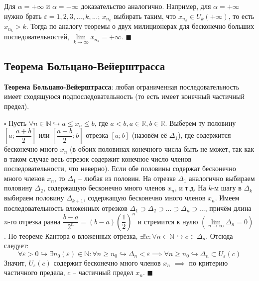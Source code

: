 \documentclass[12pt, a4paper, reqno]{article}
\begin{document}
    Для $\alpha = +\infty$ и $\alpha = -\infty$ доказательство аналогично. Например, для
    $\alpha = +\infty$ нужно брать $\varepsilon = 1, 2, 3, ..., k, ...$; $x_{n_k}$ выбирать таким,
    что $x_{n_k}\in U_{k}(+\infty)$, то есть $x_{n_k} > k$. Тогда по аналогу теоремы о двух
    милиционерах для бесконечно больших последовательностей, $\lim\limits_{k\to\infty} x_{n_k} =
    +\infty$. $\blacksquare$

\subsection{Теорема Больцано-Вейерштрасса}

    \textbf{Теорема Больцано-Вейерштрасса}: любая ограниченная последовательность имеет сходящуюся
    подпоследовательность (то есть имеет конечный частичный предел).

    $\square$ Пусть $\forall n\in\mathbb{N} \hookrightarrow a \leq x_n \leq b$, где $a < b,
    a\in\mathbb{R}, b\in\mathbb{R}$. Выберем ту половину $\left[a; \dfrac{a + b}{2}\right]$ или
    $\left[\dfrac{a + b}{2}; b\right]$ отрезка $[a; b]$ (назовём её $\Delta_1$), где содержится
    бесконечно много $x_n$ (в обоих половинах конечного числа быть не может, так как в таком случае
    весь отрезок содержит конечное число членов последовательности, что неверно). Если обе половины
    содержат бесконечно много членов $x_n$, то $\Delta_1$ -- любая из половин. На отрезке $\Delta_1$
    аналогично выбираем половину $\Delta_2$, содержащую бесконечно много членов $x_n$, и т.д. На
    $k$-м шагу в $\Delta_k$ выбираем половину $\Delta_{k+1}$, содержащую бесконечно много членов
    $x_n$. Имеем последовательность вложенных отрезков $\Delta_1 \supset \Delta_2 \supset ...\supset
    \Delta_n \supset ...$, причём длина $n$-го отрезка равна $\dfrac{b-a}{2^n} =
    (b - a)\left(\dfrac{1}{2}\right)^n$ и стремится к нулю $(\lim\limits_{n\to\infty} \Delta_n = 0)$.
    По теореме Кантора о вложенных отрезка, $\exists! c: \forall n\in\mathbb{N} \hookrightarrow
    c\in\Delta_n$. Отсюда следует:
    \begin{equation*}
        \forall\varepsilon > 0 \hookrightarrow \exists n_0(\varepsilon)\in\mathbb{N}: \forall n \geq
        n_0 \hookrightarrow \Delta_n < \varepsilon \implies
        \forall n \geq n_0 \hookrightarrow \Delta_n \subset U_{\varepsilon}(c)
    \end{equation*}
    Значит, $U_{\varepsilon}(c)$ содержит бесконечно много членов $x_n$ $\implies$ по критерию
    частичного предела, $c$ -- частичный предел $x_n$. $\blacksquare$
\end{document}
